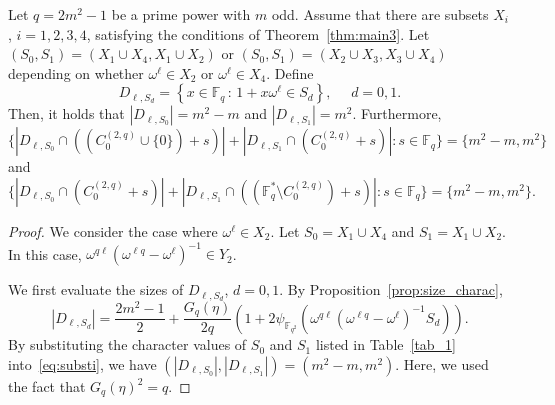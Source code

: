 \documentclass[ALCO,ThmDefs,Unicode]{cedram}
\newcommand*\F{{\mathbb F}}
\begin{document}
\begin{theo}\label{thm:twoint4}
Let $q=2m^2-1$ be a prime power with $m$ odd. Assume that there are subsets $X_i$, $i=1,2,3,4$, satisfying the conditions of Theorem~\ref{thm:main3}. Let $(S_0,S_1)=(X_1\cup X_4,X_1\cup X_2)$ or $(S_0,S_1)=(X_2\cup X_3,X_3\cup X_4)$ depending on whether $\omega^\ell\in X_2$ or $\omega^\ell\in X_4$. Define
\[
D_{\ell,S_d}=\left\{x\in \F_q\,:\, 1+x\omega^\ell\in S_d
\right\}, \quad \, \, d=0,1.
\]
Then, it holds that $|D_{\ell,S_0}|=m^2-m$ and $|D_{\ell,S_1}|=m^2$. Furthermore,
\[
\{|D_{\ell,S_0}\cap ((C_0^{(2,q)}\cup \{0\})+s)|+|D_{\ell,S_1}\cap (C_0^{(2,q)}+s)|:s\in \F_q\}=\{m^2-m,m^2\}
\]
and
\[
\{|D_{\ell,S_0}\cap (C_0^{(2,q)}+s)|+|D_{\ell,S_1}\cap ((\F_q^\ast\setminus C_0^{(2,q)})+s)|:s\in \F_q\}=\{m^2-m,m^2\}.
\]
\end{theo}
\begin{proof}
We consider the case where $\omega^\ell \in X_2$. Let $S_0=X_1\cup X_4$ and $S_1=X_1\cup X_2$. In this case, $\omega^{q\ell}(\omega^{\ell q}-\omega^{\ell})^{-1}\in Y_2$.

We first evaluate the sizes of $D_{\ell,S_d}$, $d=0,1$. By Proposition~\ref{prop:size_charac},
\begin{equation}\label{eq:substi}
|D_{\ell,S_d}|=\frac{2m^2-1}{2}+\frac{G_q(\eta)}{2q}(1+2\psi_{\F_{q^2}}(\omega^{q\ell}(\omega^{\ell q}-\omega^{\ell})^{-1}S_d)).
\end{equation}
By substituting the character values of $S_0$ and $S_1$ listed in Table~\ref{tab_1} into~\eqref{eq:substi}, we have $(|D_{\ell,S_0}|,|D_{\ell,S_1}|)=(m^2-m,m^2)$. Here, we used the fact that $G_q(\eta)^2=q$.


\end{proof}
\end{document}
